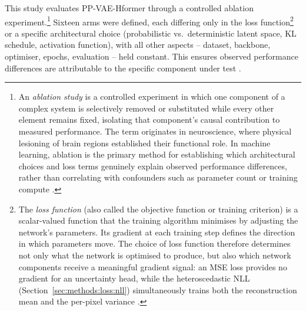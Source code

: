 \documentclass[12pt, a4paper, twoside, openright]{book}
\begin{document}
This study evaluates PP-VAE-Hformer through a controlled ablation experiment.\footnote{An \emph{ablation study} is a controlled experiment in which one component of a complex system is selectively removed or substituted while every other element remains fixed, isolating that component's causal contribution to measured performance. The term originates in neuroscience, where physical lesioning of brain regions established their functional role. In machine learning, ablation is the primary method for establishing which architectural choices and loss terms genuinely explain observed performance differences, rather than correlating with confounders such as parameter count or training compute \cite{meyes_ablation_2019}.} Sixteen arms were defined, each differing only in the loss function\footnote{The \emph{loss function} (also called the objective function or training criterion) is a scalar-valued function that the training algorithm minimises by adjusting the network's parameters. Its gradient at each training step defines the direction in which parameters move. The choice of loss function therefore determines not only what the network is optimised to produce, but also which network components receive a meaningful gradient signal: an MSE loss provides no gradient for an uncertainty head, while the heteroscedastic NLL (Section~\ref{sec:methods:loss:nll}) simultaneously trains both the reconstruction mean and the per-pixel variance \cite{kendall_what_2017}.} or a specific architectural choice (probabilistic vs.\ deterministic latent space, KL schedule, activation function), with all other aspects -- dataset, backbone, optimiser, epochs, evaluation -- held constant. This ensures observed performance differences are attributable to the specific component under test \cite{zhang_beyond_2017, liang_swinir_2021}.
\end{document}

